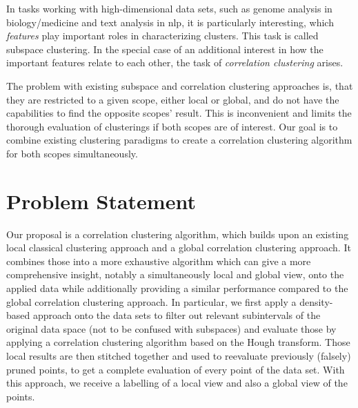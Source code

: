 In tasks working with high-dimensional data sets, such as genome analysis in biology/medicine and text analysis in \gls{nlp}, it is particularly interesting, which \textit{features} play important roles in characterizing clusters. This task is called subspace clustering. In the special case of an additional interest in how the important features relate to each other, the task of \textit{correlation clustering} arises.

The problem with existing subspace and correlation clustering approaches is, that they are restricted to a given scope, either local or global, and do not have the capabilities to find the opposite scopes' result. This is inconvenient and limits the thorough evaluation of clusterings if both scopes are of interest. Our goal is to combine existing clustering paradigms to create a correlation clustering algorithm for both scopes simultaneously.





\section{Problem Statement}
Our proposal is a correlation clustering algorithm, which builds upon an existing local classical clustering approach and a global correlation clustering approach. It combines those into a more exhaustive algorithm which can give a more comprehensive insight, notably a simultaneously local and global view, onto the applied data while additionally providing a similar performance compared to the global correlation clustering approach. In particular, we first apply a density-based approach onto the data sets to filter out relevant subintervals of the original data space (not to be confused with subspaces) and evaluate those by applying a correlation clustering algorithm based on the Hough transform. Those local results are then stitched together and used to reevaluate previously (falsely) pruned points, to get a complete evaluation of every point of the data set. With this approach, we receive a labelling of a local view and also a global view of the points. 

